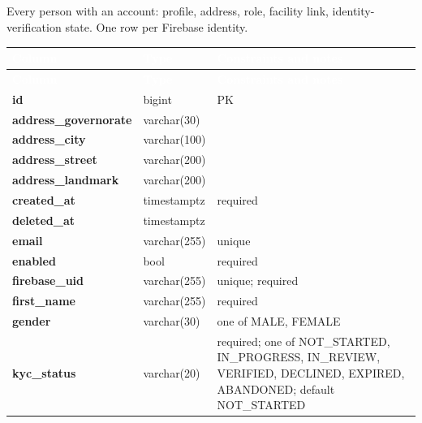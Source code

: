 \subsection*{}
Every person with an account: profile, address, role, facility link, identity-verification state. One row per Firebase identity.\par\vspace{2pt}
{\tabfont\rowband
\begin{longtable}{@{}>{\raggedright\arraybackslash}p{}>{\raggedright\arraybackslash}p{}>{\raggedright\arraybackslash}p{}@{}}
\rowcolor{najdanavy}\textcolor{white}{\sffamily\bfseries\small Column} & \textcolor{white}{\sffamily\bfseries\small Type} & \textcolor{white}{\sffamily\bfseries\small Constraints and notes}\\
\endfirsthead
\rowcolor{najdanavy}\textcolor{white}{\sffamily\bfseries\small Column} & \textcolor{white}{\sffamily\bfseries\small Type} & \textcolor{white}{\sffamily\bfseries\small Constraints and notes}\\
\endhead
\bottomrule\endlastfoot
\textbf{id} & bigint & PK\\
\textbf{address\_\allowbreak{}governorate} & varchar(30) & \\
\textbf{address\_\allowbreak{}city} & varchar(100) & \\
\textbf{address\_\allowbreak{}street} & varchar(200) & \\
\textbf{address\_\allowbreak{}landmark} & varchar(200) & \\
\textbf{created\_\allowbreak{}at} & timestamptz & required\\
\textbf{deleted\_\allowbreak{}at} & timestamptz & \\
\textbf{email} & varchar(255) & unique\\
\textbf{enabled} & bool & required\\
\textbf{firebase\_\allowbreak{}uid} & varchar(255) & unique; required\\
\textbf{first\_\allowbreak{}name} & varchar(255) & required\\
\textbf{gender} & varchar(30) & one of MALE, FEMALE\\
\textbf{kyc\_\allowbreak{}status} & varchar(20) & required; one of NOT\_\allowbreak{}STARTED, IN\_\allowbreak{}PROGRESS, IN\_\allowbreak{}REVIEW, VERIFIED, DECLINED, EXPIRED, ABANDONED; default NOT\_\allowbreak{}STARTED\\

\end{longtable}}
